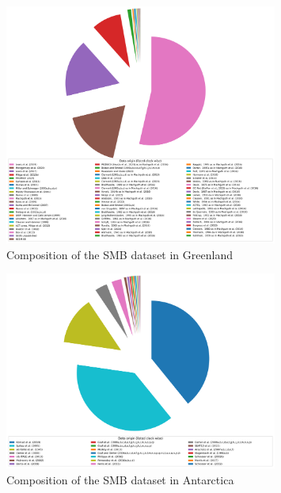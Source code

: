 \documentclass[journal abbreviation, manuscript]{copernicus}
\begin{document}
\begin{figure}[!htb]
\caption{Composition of the SMB dataset in Greenland}
\centering
\includegraphics[width=0.8\textwidth]{figures/SMB_dataset_composition_greenland.png}
\end{figure}


\begin{figure}[!htb]
\caption{Composition of the SMB dataset in Antarctica}
\centering
\includegraphics[width=0.8\textwidth]{figures/SMB_dataset_composition_antarctica.png}
\end{figure}

\FloatBarrier
\end{document}
